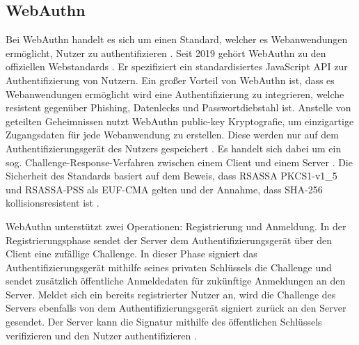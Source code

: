 \subsection{WebAuthn}
Bei WebAuthn handelt es sich um einen Standard, welcher es Webanwendungen ermöglicht, Nutzer zu authentifizieren \cite{lyastani2020fido2}. Seit 2019 gehört WebAuthn zu den offiziellen Webstandards \cite{farke2020you}. Er spezifiziert ein standardisiertes JavaScript \ac{API} zur Authentifizierung von Nutzern. Ein großer Vorteil von WebAuthn ist, dass es Webanwendungen ermöglicht wird eine Authentifizierung zu integrieren, welche resistent gegenüber Phishing, Datenlecks und Passwortdiebstahl ist. Anstelle von geteilten Geheimnissen nutzt WebAuthn public-key Kryptografie, um einzigartige Zugangsdaten für jede Webanwendung zu erstellen. Diese werden nur auf dem Authentifizierungsgerät des Nutzers gespeichert \cite{farke2020you}. Es handelt sich dabei um ein sog. Challenge-Response-Verfahren zwischen einem Client und einem Server \cite{barbosa2021provable}. Die Sicherheit des Standards basiert auf dem Beweis, dass RSASSA PKCS1-v1\_5 und RSASSA-PSS als \ac{EUF-CMA} gelten und der Annahme, dass SHA-256 kollisionsresistent ist \cite{barbosa2021provable}.

WebAuthn unterstützt zwei Operationen: Registrierung und Anmeldung. In der Registrierungsphase sendet der Server dem Authentifizierungsgerät über den Client eine zufällige Challenge. In dieser Phase signiert das Authentifizierungsgerät mithilfe seines privaten Schlüssels die Challenge und sendet zusätzlich öffentliche Anmeldedaten für zukünftige Anmeldungen an den Server. Meldet sich ein bereits registrierter Nutzer an, wird die Challenge des Servers ebenfalls von dem Authentifizierungsgerät signiert zurück an den Server gesendet. Der Server kann die Signatur mithilfe des öffentlichen Schlüssels verifizieren und den Nutzer authentifizieren \cite{barbosa2021provable}.

